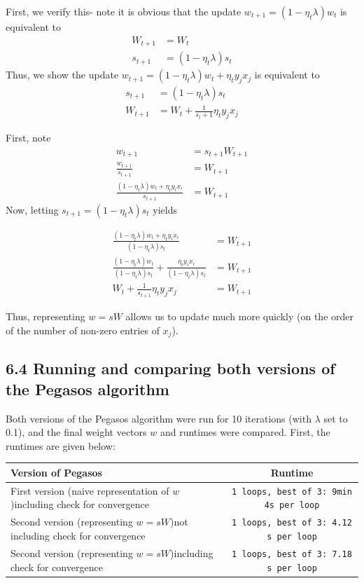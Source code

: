 \documentclass[paper=a4, fontsize=11pt]{scrartcl} %
\numberwithin{equation}{section} %
\numberwithin{figure}{section} %
\numberwithin{table}{section} %
\begin{document}
First, we verify this- note it is obvious that the update $w_{t+1} = (1 -  \eta_t \lambda) w_t$ is equivalent to
\begin{align*}
W_{t+1} &= W_{t} \\
s_{t+1} & =  (1 -  \eta_t \lambda) s_t
\end{align*}
Thus, we show the update $w_{t+1} = (1 -  \eta_t \lambda) w_t + \eta_t y_j x_j$ is equivalent to
\begin{align*}
s_{t+1} &= (1 - \eta_t \lambda) s_t \\
W_{t+1} & = W_t + \frac{1}{s_t + 1} \eta_t y_j x_j
\end{align*}

First, note
\begin{align*}
w_{t+1} &= s_{t+1}W_{t+1} \\
\frac{w_{t+1}}{s_{t+1}} & = W_{t+1} \\
\frac{(1 - \eta_t \lambda) w_{t} + \eta_t y_i  x_i}{s_{t+1}} & = W_{t+1}
\end{align*}
Now, letting $s_{t+1} = (1- \eta_t \lambda) s_t$ yields

\begin{align*}
\frac{(1 - \eta_t \lambda) w_{t} + \eta_t y_i  x_i}{(1- \eta_t \lambda) s_t} &= W_{t+1} \\
\frac{(1 - \eta_t \lambda) w_{t}}{(1- \eta_t \lambda) s_t} +  \frac{\eta_t y_i  x_i}{(1- \eta_t \lambda) s_t} &= W_{t+1} \\
W_t + \frac{1}{s_{t+1}} \eta_t y_j x_j &= W_{t+1}
\end{align*}

Thus, representing $w = sW$ allows us to update much more quickly (on the order of the number of non-zero entries of $x_j$).

\subsection*{6.4 Running and comparing both versions of the Pegasos algorithm}

Both versions of the Pegasos algorithm were run for 10 iterations (with $\lambda$ set to 0.1), and the final weight vectors $w$ and runtimes were compared. First, the runtimes are given below:

\begin{center}
\begin{tabular}{| p{6.6cm} | c |}
\hline
\textbf{Version of Pegasos} & \textbf{Runtime} \\
\hline
First version (naive representation of $w$)\newline including check for convergence & \texttt{1 loops, best of 3: 9min 4s per loop} \\
\hline
Second version (representing $w = sW$)\newline not including check for convergence & \texttt{1 loops, best of 3: 4.12 s per loop} \\
\hline\hline
Second version (representing $w = sW$)\newline including check for convergence & \texttt{1 loops, best of 3: 7.18 s per loop} \\
\hline
\end{tabular} \\
\end{center}
\end{document}
